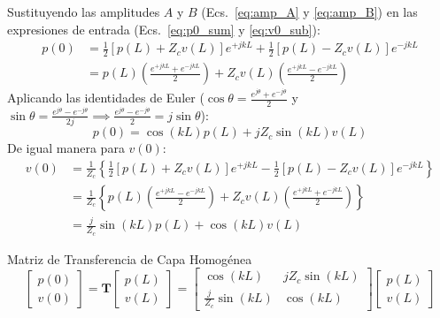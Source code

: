 \documentclass[11pt,a4paper]{article}
\begin{document}
Sustituyendo las amplitudes $A$ y $B$ (Ecs.~\ref{eq:amp_A} y \ref{eq:amp_B}) en las expresiones de entrada (Ecs.~\ref{eq:p0_sum} y \ref{eq:v0_sub}):
\begin{align}
p(0) &= \frac{1}{2} \left[ p(L) + Z_c v(L) \right] e^{+j k L} + \frac{1}{2} \left[ p(L) - Z_c v(L) \right] e^{-j k L} \nonumber\\
&= p(L) \left( \frac{e^{+j k L} + e^{-j k L}}{2} \right) + Z_c v(L) \left( \frac{e^{+j k L} - e^{-j k L}}{2} \right)
\end{align}
Aplicando las identidades de Euler ($\cos\theta = \frac{e^{j\theta} + e^{-j\theta}}{2}$ y $\sin\theta = \frac{e^{j\theta} - e^{-j\theta}}{2j} \implies \frac{e^{j\theta} - e^{-j\theta}}{2} = j\sin\theta$):
\begin{equation}
p(0) = \cos(k L) p(L) + j Z_c \sin(k L) v(L)
\end{equation}
De igual manera para $v(0)$:
\begin{align}
v(0) &= \frac{1}{Z_c} \left\{ \frac{1}{2} \left[ p(L) + Z_c v(L) \right] e^{+j k L} - \frac{1}{2} \left[ p(L) - Z_c v(L) \right] e^{-j k L} \right\} \nonumber\\
&= \frac{1}{Z_c} \left\{ p(L) \left( \frac{e^{+j k L} - e^{-j k L}}{2} \right) + Z_c v(L) \left( \frac{e^{+j k L} + e^{-j k L}}{2} \right) \right\} \nonumber\\
&= \frac{j}{Z_c} \sin(k L) p(L) + \cos(k L) v(L)
\end{align}

\begin{infobox}{Matriz de Transferencia de Capa Homogénea}
\begin{equation}
\begin{bmatrix} p(0) \\ v(0) \end{bmatrix} = \mathbf{T} \begin{bmatrix} p(L) \\ v(L) \end{bmatrix} = \begin{bmatrix} \cos(k L) & j Z_c \sin(k L) \\ \frac{j}{Z_c} \sin(k L) & \cos(k L) \end{bmatrix} \begin{bmatrix} p(L) \\ v(L) \end{bmatrix}
\end{equation}
\end{infobox}
\end{document}
